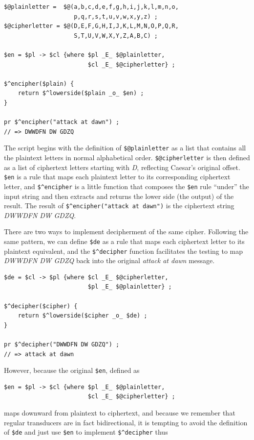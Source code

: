 \begin{Verbatim}
$@plainletter =  $@(a,b,c,d,e,f,g,h,i,j,k,l,m,n,o,
                    p,q,r,s,t,u,v,w,x,y,z) ;
$@cipherletter = $@(D,E,F,G,H,I,J,K,L,M,N,O,P,Q,R,
                    S,T,U,V,W,X,Y,Z,A,B,C) ;

$en = $pl -> $cl {where $pl _E_ $@plainletter,
                        $cl _E_ $@cipherletter} ;

$^encipher($plain) {
    return $^lowerside($plain _o_ $en) ;
}

pr $^encipher("attack at dawn") ;
// => DWWDFN DW GDZQ
\end{Verbatim}



The script begins with the definition of \texttt{\$@plainletter} as a list that contains all the plaintext letters in
normal alphabetical order.  \texttt{\$@cipherletter} is then defined as a list of ciphertext letters starting with \emph{D},
reflecting Caesar's original offset.
\texttt{\$en} is a rule that maps each plaintext letter to its corresponding ciphertext letter, and \verb!$^encipher! is a
little function that composes the \verb!$en! rule ``under'' the input string and then extracts and returns the lower side
(the output) of the result.  The result of \verb!$^encipher("attack at dawn")! 
is the ciphertext string \emph{DWWDFN DW GDZQ}.

There are two ways to implement decipherment of the same cipher.  Following the same pattern, we can define \verb!$de! as
a rule that maps each ciphertext letter to its plaintext equivalent, and the \verb!$^decipher! function facilitates the
testing to map \emph{DWWDFN DW GDZQ} back into the original \emph{attack at dawn} message.

\begin{Verbatim}
$de = $cl -> $pl {where $cl _E_ $@cipherletter,
                        $pl _E_ $@plainletter} ;

$^decipher($cipher) {
    return $^lowerside($cipher _o_ $de) ;
}

pr $^decipher("DWWDFN DW GDZQ") ;
// => attack at dawn
\end{Verbatim}

However, because the original \verb!$en!, defined as


\begin{Verbatim}
$en = $pl -> $cl {where $pl _E_ $@plainletter,
                        $cl _E_ $@cipherletter} ;
\end{Verbatim}

\noindent
maps downward from plaintext to ciphertext, and because we remember that regular transducers are in fact bidirectional, it
is tempting to avoid the definition of \verb!$de! and just use \verb!$en! to implement \verb!$^decipher! thus


